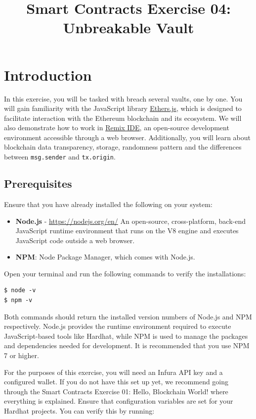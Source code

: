 \documentclass[12pt]{article}
\title{Smart Contracts Exercise 04: \\ Unbreakable Vault}
\author{}
\date{}
\begin{document}
\maketitle
\section{Introduction}
In this exercise, you will be tasked with breach several vaults, one by one. You will gain familiarity with the JavaScript library \href{https://docs.ethers.org/v6}{Ethers.js}, which is designed to facilitate interaction with the Ethereum blockchain and its ecosystem. We will also demonstrate how to work in \href{https://remix.ethereum.org/}{Remix IDE}, an open-source development environment accessible through a web browser. Additionally, you will learn about blockchain data transparency, storage, randomness pattern and the differences between \texttt{msg.sender} and \texttt{tx.origin}.

\subsection*{Prerequisites}

Ensure that you have already installed the following on your system:

\begin{itemize}
    \item \textbf{Node.js} - \url{https://nodejs.org/en/}
    An open-source, cross-platform, back-end JavaScript runtime environment that runs on the V8 engine and executes JavaScript code outside a web browser. 
    \item \textbf{NPM}: Node Package Manager, which comes with Node.js.
\end{itemize}

Open your terminal and run the following commands to verify the installations:

\begin{verbatim}
$ node -v
$ npm -v
\end{verbatim}

Both commands should return the installed version numbers of Node.js and NPM respectively. Node.js provides the runtime environment required to execute JavaScript-based tools like Hardhat, while NPM is used to manage the packages and dependencies needed for development. It is recommended that you use NPM 7 or higher.

For the purposes of this exercise, you will need an Infura API key and a configured wallet. If you do not have this set up yet, we recommend going through the Smart Contracts Exercise 01: Hello, Blockchain World! where everything is explained. Ensure that configuration variables are set for your Hardhat projects. You can verify this by running:
\end{document}
